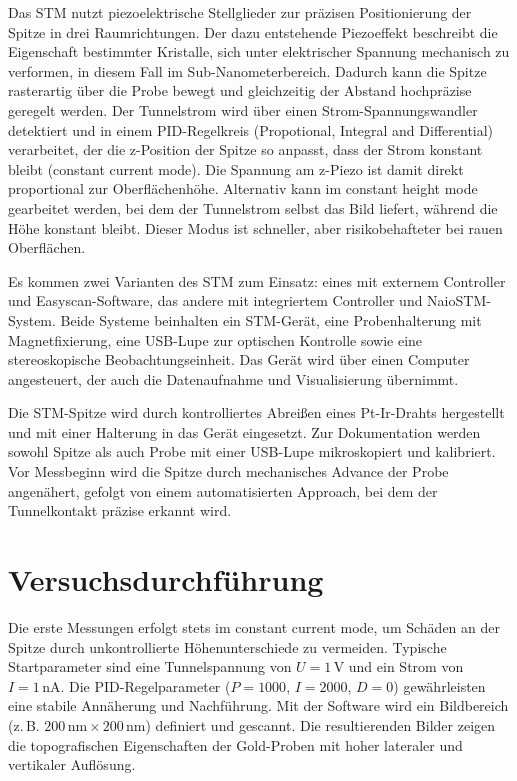 Das STM nutzt piezoelektrische Stellglieder zur präzisen Positionierung der Spitze in drei Raumrichtungen. Der dazu entstehende Piezoeffekt beschreibt die Eigenschaft bestimmter Kristalle, sich unter elektrischer Spannung mechanisch zu verformen, in diesem Fall im Sub-Nanometerbereich. Dadurch kann die Spitze rasterartig über die Probe bewegt und gleichzeitig der Abstand hochpräzise geregelt werden. Der Tunnelstrom wird über einen Strom-Spannungswandler detektiert und in einem PID-Regelkreis (Propotional, Integral and Differential) verarbeitet, der die z-Position der Spitze so anpasst, dass der Strom konstant bleibt (constant current mode). Die Spannung am z-Piezo ist damit direkt proportional zur Oberflächenhöhe. Alternativ kann im constant height mode gearbeitet werden, bei dem der Tunnelstrom selbst das Bild liefert, während die Höhe konstant bleibt. Dieser Modus ist schneller, aber risikobehafteter bei rauen Oberflächen.


Es kommen zwei Varianten des STM zum Einsatz: eines mit externem Controller und Easyscan-Software, das andere mit integriertem Controller und NaioSTM-System. Beide Systeme beinhalten ein STM-Gerät, eine Probenhalterung mit Magnetfixierung, eine USB-Lupe zur optischen Kontrolle sowie eine stereoskopische Beobachtungseinheit. Das Gerät wird über einen Computer angesteuert, der auch die Datenaufnahme und Visualisierung übernimmt.

Die STM-Spitze wird durch kontrolliertes Abreißen eines Pt-Ir-Drahts hergestellt und mit einer Halterung in das Gerät eingesetzt. Zur Dokumentation werden sowohl Spitze als auch Probe mit einer USB-Lupe mikroskopiert und kalibriert. Vor Messbeginn wird die Spitze durch mechanisches Advance der Probe angenähert, gefolgt von einem automatisierten Approach, bei dem der Tunnelkontakt präzise erkannt wird.

\chapter{Versuchsdurchführung}

Die erste Messungen erfolgt stets im constant current mode, um Schäden an der Spitze durch unkontrollierte Höhenunterschiede zu vermeiden. Typische Startparameter sind eine Tunnelspannung von $U = 1\,\text{V}$ und ein Strom von $I = 1\,\text{nA}$. Die PID-Regelparameter ($P = 1000$, $I = 2000$, $D = 0$) gewährleisten eine stabile Annäherung und Nachführung. Mit der Software wird ein Bildbereich (z.\,B. $200\,\text{nm} \times 200\,\text{nm}$) definiert und gescannt. Die resultierenden Bilder zeigen die topografischen Eigenschaften der Gold-Proben mit hoher lateraler und vertikaler Auflösung.

